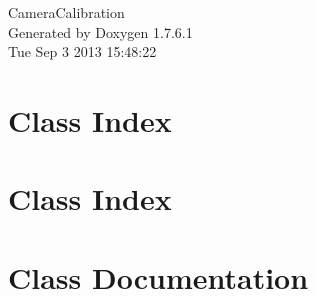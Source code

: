 \documentclass[a4paper]{book}
\begin{document}
\hypersetup{pageanchor=false,citecolor=blue}
\begin{titlepage}
\vspace*{7cm}
\begin{center}
{\Large \-Camera\-Calibration }\\
\vspace*{1cm}
{\large \-Generated by Doxygen 1.7.6.1}\\
\vspace*{0.5cm}
{\small Tue Sep 3 2013 15:48:22}\\
\end{center}
\end{titlepage}
\clearemptydoublepage
{}
\tableofcontents
\clearemptydoublepage
{}
\hypersetup{pageanchor=true,citecolor=blue}
\chapter{\-Class \-Index}

\chapter{\-Class \-Index}

\chapter{\-Class \-Documentation}




































\printindex
\end{document}

